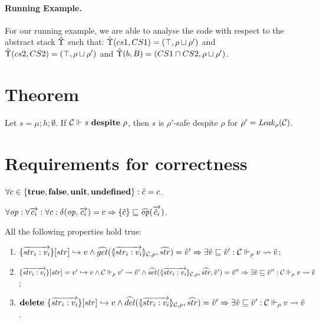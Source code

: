\paragraph{Running Example.}
For our running example, we are able to analyse the code with respect
to the abstract stack $\hat{\Upsilon}$ such that: $\hat{\Upsilon}(cs1, CS1) =
(\top,\rho \sqcup \rho')$ and $\hat{\Upsilon}(cs2,CS2) = (\top,\rho \sqcup
\rho')$ and $\hat{\Upsilon}(b,B) = (CS1 \sqcap CS2,\rho \sqcup \rho')$.

\section{Theorem}
\label{sec:Theorem}
\begin{theorem}
\label{thm:safety-compromise}
Let $s = \mu;h;\emptyset$. If ${\cal C} \Vdash s \ \mathbf{despite}\ \rho$, then $s$ is $\rho'$-safe despite $\rho$ for $\rho' = \mathit{Leak}_{\rho}({\cal C})$. 
\end{theorem}

\section{Requirements for correctness}
\label{sec:CorrectnesReqs}
\begin{assumption}
\label{asm:finite}
$\forall c \in \{\mathbf{true},\mathbf{false},\mathbf{unit},\mathbf{undefined}\}: \hat{c} = c$.
\end{assumption}

\begin{assumption}
\label{asm:sound-abs-op}
$\forall \mathit{op}: \forall \overrightarrow{c_i}: \forall c: \delta(\mathit{op},\overrightarrow{c_i}) = c \Rightarrow \{\hat{c}\} \sqsubseteq \widehat{\mathit{op}}(\overrightarrow{{\hat{c}_i}})$.
\end{assumption}

\begin{assumption}
\label{asm:sound-abs-records}
All the following properties hold true:
\begin{enumerate}
\item $\{\overrightarrow{str_i:v_i}\}[str] \hookrightarrow v \wedge \widehat{get}(\langle\!| \overrightarrow{str_i:v_i} |\!\rangle_{{\cal C},\rho},\widehat{str}) = \hat{v}' \Rightarrow \exists \hat{v} \sqsubseteq \hat{v}': {\cal C} \Vdash_{\rho} v \rightsquigarrow \hat{v}$;
\item $\{\overrightarrow{str_i:v_i}\}[str] = v' \hookrightarrow v \wedge {\cal C} \Vdash_{\rho} v' \rightsquigarrow \hat{v}' \wedge \widehat{set}(\langle\!| \overrightarrow{str_i:v_i} |\!\rangle_{{\cal C},\rho},\widehat{str},\hat{v}') = \hat{v}'' \Rightarrow \exists \hat{v} \sqsubseteq \hat{v}'': {\cal C} \Vdash_{\rho} v \rightsquigarrow \hat{v}$;
\item $\mathbf{delete}\ \{\overrightarrow{str_i:v_i}\}[str] \hookrightarrow v \wedge \widehat{del}(\langle\!| \overrightarrow{str_i:v_i} |\!\rangle_{{\cal C},\rho},\widehat{str}) = \hat{v}' \Rightarrow \exists \hat{v} \sqsubseteq \hat{v}': {\cal C} \Vdash_{\rho} v \rightsquigarrow \hat{v}$.
\end{enumerate}
\end{assumption}


